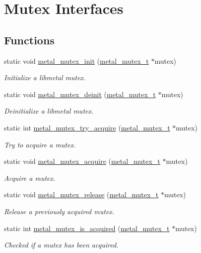 \hypertarget{group__mutex}{}\section{Mutex Interfaces}
\label{group__mutex}
\subsection*{Functions}
\begin{DoxyCompactItemize}
\item 
static void \hyperlink{group__mutex_ga0be5610e9c7ee6902dd3d6240ca82271}{metal\+\_\+mutex\+\_\+init} (\hyperlink{structmetal__mutex__t}{metal\+\_\+mutex\+\_\+t} $\ast$mutex)
\begin{DoxyCompactList}\small\item\em Initialize a libmetal mutex. \end{DoxyCompactList}\item 
static void \hyperlink{group__mutex_ga641fc96da84389981f866bb14356b6f1}{metal\+\_\+mutex\+\_\+deinit} (\hyperlink{structmetal__mutex__t}{metal\+\_\+mutex\+\_\+t} $\ast$mutex)
\begin{DoxyCompactList}\small\item\em Deinitialize a libmetal mutex. \end{DoxyCompactList}\item 
static int \hyperlink{group__mutex_ga290699ccc31f77849ffc21e779795361}{metal\+\_\+mutex\+\_\+try\+\_\+acquire} (\hyperlink{structmetal__mutex__t}{metal\+\_\+mutex\+\_\+t} $\ast$mutex)
\begin{DoxyCompactList}\small\item\em Try to acquire a mutex. \end{DoxyCompactList}\item 
static void \hyperlink{group__mutex_ga2ac9a9458e5d2b2d666c0a2c02e68bba}{metal\+\_\+mutex\+\_\+acquire} (\hyperlink{structmetal__mutex__t}{metal\+\_\+mutex\+\_\+t} $\ast$mutex)
\begin{DoxyCompactList}\small\item\em Acquire a mutex. \end{DoxyCompactList}\item 
static void \hyperlink{group__mutex_ga48df0681ac127c8d268845b57e8016b8}{metal\+\_\+mutex\+\_\+release} (\hyperlink{structmetal__mutex__t}{metal\+\_\+mutex\+\_\+t} $\ast$mutex)
\begin{DoxyCompactList}\small\item\em Release a previously acquired mutex. \end{DoxyCompactList}\item 
static int \hyperlink{group__mutex_ga377c63b040af060bdbe26fdaa98231df}{metal\+\_\+mutex\+\_\+is\+\_\+acquired} (\hyperlink{structmetal__mutex__t}{metal\+\_\+mutex\+\_\+t} $\ast$mutex)
\begin{DoxyCompactList}\small\item\em Checked if a mutex has been acquired. \end{DoxyCompactList}\end{DoxyCompactItemize}


